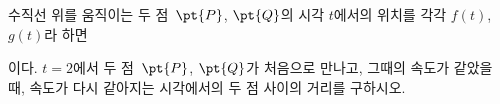 수직선 위를 움직이는 두 점~$\pt{P}$, $\pt{Q}$의 시각 $t$에서의 위치를 각각 $f(t)$, $g(t)$라 하면\par\smallskip{}\par\smallskip\noindent 이다. $t=2$에서 두 점~$\pt{P}$, $\pt{Q}$가 처음으로 만나고, 그때의 속도가 같았을 때, 속도가 다시 같아지는 시각에서의 두 점 사이의 거리를 구하시오. 
